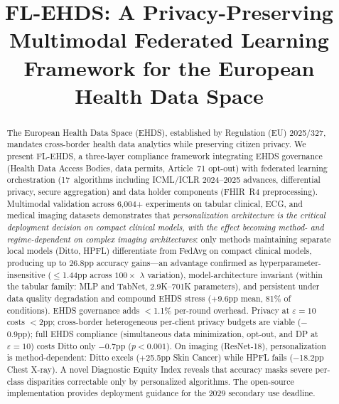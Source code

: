 \documentclass[conference]{IEEEtran}
\begin{document}
\title{FL-EHDS: A Privacy-Preserving Multimodal Federated Learning Framework for the European Health Data Space}

\author{
}

\maketitle

\begin{abstract}
The European Health Data Space (EHDS), established by Regulation (EU) 2025/327, mandates cross-border health data analytics while preserving citizen privacy. We present FL-EHDS, a three-layer compliance framework integrating EHDS governance (Health Data Access Bodies, data permits, Article~71 opt-out) with federated learning orchestration (17~algorithms including ICML/ICLR 2024--2025 advances, differential privacy, secure aggregation) and data holder components (FHIR~R4 preprocessing). Multimodal validation across 6,004+ experiments on tabular clinical, ECG, and medical imaging datasets demonstrates that \textit{personalization architecture is the critical deployment decision on compact clinical models, with the effect becoming method- and regime-dependent on complex imaging architectures}: only methods maintaining separate local models (Ditto, HPFL) differentiate from FedAvg on compact clinical models, producing up to 26.8pp accuracy gains---an advantage confirmed as hyperparameter-insensitive ($\leq$1.44pp across $100\times$ $\lambda$ variation), model-architecture invariant (within the tabular family: MLP and TabNet, 2.9K--701K parameters), and persistent under data quality degradation and compound EHDS stress ($+$9.6pp mean, 81\% of conditions). EHDS governance adds $<$1.1\% per-round overhead. Privacy at $\varepsilon{=}10$ costs $<$2pp; cross-border heterogeneous per-client privacy budgets are viable ($-$0.9pp); full EHDS compliance (simultaneous data minimization, opt-out, and DP at $\varepsilon{=}10$) costs Ditto only $-$0.7pp ($p{<}0.001$). On imaging (ResNet-18), personalization is method-dependent: Ditto excels ($+$25.5pp Skin Cancer) while HPFL fails ($-$18.2pp Chest X-ray). A novel Diagnostic Equity Index reveals that accuracy masks severe per-class disparities correctable only by personalized algorithms. The open-source implementation provides deployment guidance for the 2029 secondary use deadline.
\end{abstract}
\end{document}
